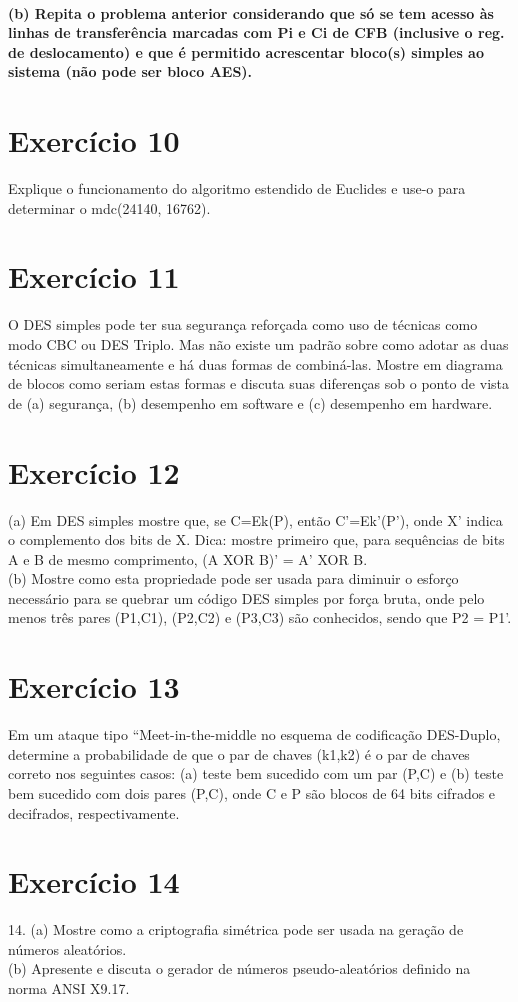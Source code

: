 \documentclass[10pt,a4paper]{article}
\begin{document}
\paragraph*{(b) Repita o problema anterior considerando que só se tem acesso às linhas de transferência marcadas com Pi e Ci de CFB (inclusive o reg. de deslocamento) e que é permitido acrescentar bloco(s) simples ao sistema (não pode ser bloco AES).}
\section*{Exercício 10}
Explique o funcionamento do algoritmo estendido de Euclides e use-o para determinar o mdc(24140, 16762).
\section*{Exercício 11}
O DES simples pode ter sua segurança reforçada como uso de técnicas como modo CBC ou DES Triplo. Mas não existe um padrão sobre como adotar as duas técnicas simultaneamente e há duas formas de combiná-las. Mostre em diagrama de blocos como seriam estas formas e discuta suas diferenças sob o ponto de vista de (a) segurança, (b) desempenho em software e (c) desempenho em hardware.\\
\section*{Exercício 12}
(a) Em DES simples mostre que, se C=Ek(P), então C'=Ek'(P'), onde X' indica o complemento dos bits de X. Dica: mostre primeiro que, para sequências de bits A e B de mesmo comprimento, (A XOR B)' = A' XOR B.\\
(b) Mostre como esta propriedade pode ser usada para diminuir o esforço necessário para se quebrar um código DES simples por força bruta, onde pelo menos três pares (P1,C1), (P2,C2) e (P3,C3) são conhecidos, sendo que P2 = P1'.\\
\section*{Exercício 13}
Em um ataque tipo ``Meet-in-the-middle no esquema de codificação DES-Duplo, determine a probabilidade de que o par de chaves (k1,k2) é o par de chaves correto nos seguintes casos: (a) teste bem sucedido com um par (P,C) e (b) teste bem sucedido com dois pares (P,C), onde C e P são blocos de 64 bits cifrados e decifrados, respectivamente.\\
\section*{Exercício 14}
14. (a) Mostre como a criptografia simétrica pode ser usada na geração de números aleatórios.\\
(b) Apresente e discuta o gerador de números pseudo-aleatórios definido na norma ANSI X9.17.\\
\end{document}
